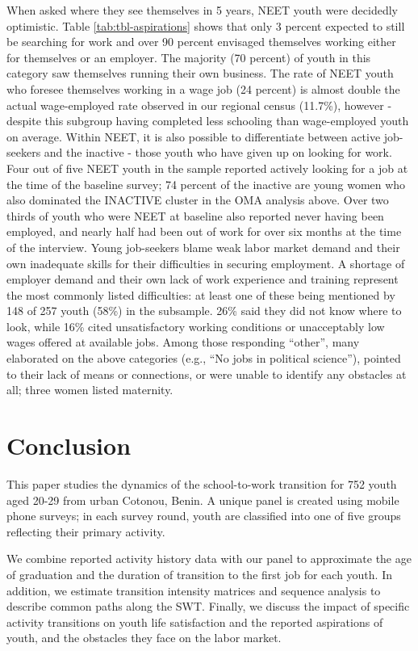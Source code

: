 \documentclass[
  11pt,
a4paper
]{article}
\begin{document}
When asked where they see themselves in 5 years, NEET youth were decidedly optimistic. Table \ref{tab:tbl-aspirations} shows that only 3 percent expected to still be searching for work and over 90 percent envisaged themselves working either for themselves or an employer. The majority (70 percent) of youth in this category saw themselves running their own business. The rate of NEET youth who foresee themselves working in a wage job (24 percent) is almost double the actual wage-employed rate observed in our regional census (11.7\%), however - despite this subgroup having completed less schooling than wage-employed youth on average. Within NEET, it is also possible to differentiate between active job-seekers and the inactive - those youth who have given up on looking for work. Four out of five NEET youth in the sample reported actively looking for a job at the time of the baseline survey; 74 percent of the inactive are young women who also dominated the INACTIVE cluster in the OMA analysis above. Over two thirds of youth who were NEET at baseline also reported never having been employed, and nearly half had been out of work for over six months at the time of the interview. Young job-seekers blame weak labor market demand and their own inadequate skills for their difficulties in securing employment. A shortage of employer demand and their own lack of work experience and training represent the most commonly listed difficulties: at least one of these being mentioned by 148 of 257 youth (58\%) in the subsample. 26\% said they did not know where to look, while 16\% cited unsatisfactory working conditions or unacceptably low wages offered at available jobs. Among those responding ``other'', many elaborated on the above categories (e.g., ``No jobs in political science''), pointed to their lack of means or connections, or were unable to identify any obstacles at all; three women listed maternity.

\hypertarget{survey-conclusion}{%
\section{Conclusion}\label{survey-conclusion}}

This paper studies the dynamics of the school-to-work transition for 752 youth aged 20-29 from urban Cotonou, Benin. A unique panel is created using mobile phone surveys; in each survey round, youth are classified into one of five groups reflecting their primary activity.

We combine reported activity history data with our panel to approximate the age of graduation and the duration of transition to the first job for each youth. In addition, we estimate transition intensity matrices and sequence analysis to describe common paths along the SWT. Finally, we discuss the impact of specific activity transitions on youth life satisfaction and the reported aspirations of youth, and the obstacles they face on the labor market.
\end{document}
